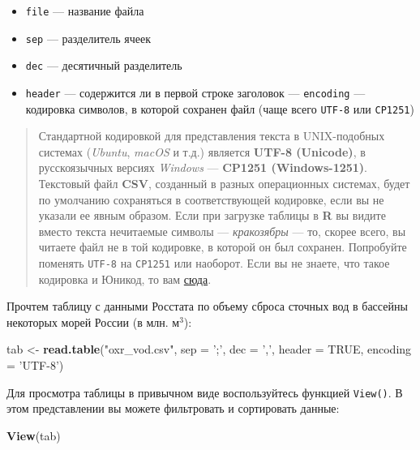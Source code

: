 \documentclass[]{book}
\newenvironment{Shaded}{\begin{snugshade}}{\end{snugshade}}
\newcommand{\KeywordTok}[1]{\textcolor[rgb]{0.13,0.29,0.53}{\textbf{#1}}}
\newcommand{\DataTypeTok}[1]{\textcolor[rgb]{0.13,0.29,0.53}{#1}}
\newcommand{\StringTok}[1]{\textcolor[rgb]{0.31,0.60,0.02}{#1}}
\newcommand{\OtherTok}[1]{\textcolor[rgb]{0.56,0.35,0.01}{#1}}
\newcommand{\NormalTok}[1]{#1}
\providecommand{\tightlist}{%
  \setlength{\itemsep}{0pt}\setlength{\parskip}{0pt}}
\begin{document}
\begin{itemize}
\tightlist
\item
  \texttt{file} --- название файла
\item
  \texttt{sep} --- разделитель ячеек
\item
  \texttt{dec} --- десятичный разделитель
\item
  \texttt{header} --- содержится ли в первой строке заголовок ---
  \texttt{encoding} --- кодировка символов, в которой сохранен файл
  (чаще всего \texttt{UTF-8} или \texttt{CP1251})
\end{itemize}

\begin{quote}
Стандартной кодировкой для представления текста в UNIX-подобных системах
(\emph{Ubuntu}, \emph{macOS} и т.д.) является \textbf{UTF-8 (Unicode)},
в русскоязычных версиях \emph{Windows} --- \textbf{CP1251
(Windows-1251)}. Текстовый файл \textbf{CSV}, созданный в разных
операционных системах, будет по умолчанию сохраняться в соответствующей
кодировке, если вы не указали ее явным образом. Если при загрузке
таблицы в \textbf{R} вы видите вместо текста нечитаемые символы ---
\emph{кракозябры} --- то, скорее всего, вы читаете файл не в той
кодировке, в которой он был сохранен. Попробуйте поменять \texttt{UTF-8}
на \texttt{CP1251} или наоборот. Если вы не знаете, что такое кодировка
и Юникод, то вам
\href{https://ru.wikipedia.org/wiki/Набор_символов}{сюда}.
\end{quote}

Прочтем таблицу с данными Росстата по объему сброса сточных вод в
бассейны некоторых морей России (в млн. м\(^3\)):

\begin{Shaded}
\begin{Highlighting}[]
\NormalTok{tab <-}\StringTok{ }\KeywordTok{read.table}\NormalTok{(}\StringTok{"oxr_vod.csv"}\NormalTok{,}
                  \DataTypeTok{sep =} \StringTok{';'}\NormalTok{,}
                  \DataTypeTok{dec =} \StringTok{','}\NormalTok{,}
                  \DataTypeTok{header =} \OtherTok{TRUE}\NormalTok{,}
                  \DataTypeTok{encoding =} \StringTok{'UTF-8'}\NormalTok{)}
\end{Highlighting}
\end{Shaded}

Для просмотра таблицы в привычном виде воспользуйтесь функцией
\texttt{View()}. В этом представлении вы можете фильтровать и
сортировать данные:

\begin{Shaded}
\begin{Highlighting}[]
\KeywordTok{View}\NormalTok{(tab)}
\end{Highlighting}
\end{Shaded}
\end{document}
